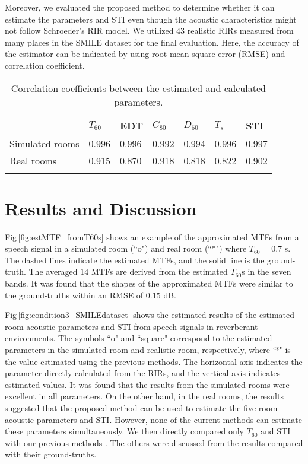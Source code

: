 \documentclass[conference]{IEEEtran}
\begin{document}
	Moreover, we evaluated the proposed method to determine whether it can estimate the parameters and STI even though the acoustic characteristics might not follow Schroeder's RIR model. We utilized $43$ realistic RIRs measured from many places in the SMILE dataset \cite{SMILE} for the final evaluation. Here, the accuracy of the estimator can be indicated by using root-mean-square error (RMSE) and correlation coefficient. 
	
	\begin{table}[t]
		\centering
		\caption{Correlation coefficients between the estimated and calculated parameters.}
		\label{tab:rho}
		\begin{tabular}{@{}lllllll@{}}
			
			\toprule
			& $T_{60}$ & EDT & $C_{80}$ & $D_{50}$ & $T_s$ & STI \\ \midrule
			Simulated rooms & 0.996   & 0.996    & 0.992      & 0.994    & 0.996   & 0.997 \\ \midrule
			Real rooms & 0.915   & 0.870    & 0.918      & 0.818    & 0.822   & 0.902\\ \midrule
			\vspace{-5mm}
		\end{tabular}
	\end{table}
	
	\section{Results and Discussion}
	Fig\,\ref{fig:estMTF_fromT60s} shows an example of the approximated MTFs from a speech signal in a simulated room (``o") and real room (``*") where $T_{60}\!=\!0.7$ s. The dashed lines indicate the estimated MTFs, and the solid line is the ground-truth. The averaged $14$ MTFs are derived from the estimated $T_{60}$s in the seven bands. It was found that the shapes of the approximated MTFs were similar to the ground-truths within an RMSE of $0.15$ dB. 
	
	Fig\,\ref{fig:condition3_SMILEdataset} shows the estimated results of the estimated room-acoustic parameters and STI from speech signals in reverberant environments. The symbols ``o" and ``square" correspond to the estimated parameters in the simulated room and realistic room, respectively, where `*" is the value estimated using the previous methods. The horizontal axis indicates the parameter directly calculated from the RIRs, and the vertical axis indicates estimated values. It was found that the results from the simulated rooms were excellent in all parameters. On the other hand, in the real rooms, the results suggested that the proposed method can be used to estimate the five room-acoustic parameters and STI. However, none of the current methods can estimate these parameters simultaneously. We then directly compared only $T_{60}$ and STI with our previous methods \cite{MU_T60,Me_APSIPA2019}. The others were discussed from the results compared with their ground-truths. 
	
\end{document}
